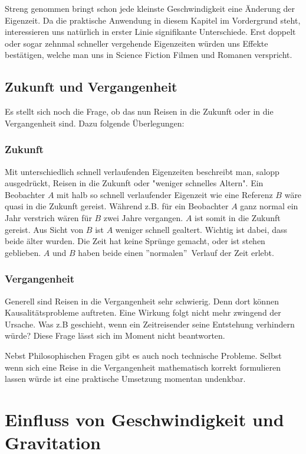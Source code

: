 \begin{refsection}
Streng genommen bringt schon jede kleinste Geschwindigkeit eine Änderung der Eigenzeit. Da die praktische Anwendung in diesem Kapitel im Vordergrund steht, interessieren uns natürlich in erster Linie signifikante Unterschiede. Erst doppelt oder sogar zehnmal schneller vergehende Eigenzeiten w\"urden uns Effekte best\"atigen, welche man uns in Science Fiction Filmen und Romanen verspricht.

\subsection{Zukunft und Vergangenheit}
Es stellt sich noch die Frage, ob das nun Reisen in die Zukunft oder in die Vergangenheit sind. Dazu folgende Überlegungen:

\subsubsection{Zukunft}
Mit unterschiedlich schnell verlaufenden Eigenzeiten beschreibt man, salopp ausgedrückt, Reisen in die Zukunft oder "weniger schnelles Altern". Ein Beobachter $A$ mit halb so schnell verlaufender Eigenzeit wie eine Referenz $B$ wäre quasi in die Zukunft gereist.
Während z.B. für ein Beobachter $A$ ganz normal ein Jahr verstrich wären für $B$ zwei Jahre vergangen. $A$ ist somit in die Zukunft gereist. Aus Sicht von $B$ ist $A$ weniger schnell gealtert. Wichtig ist dabei, dass beide älter wurden. Die Zeit hat keine Sprünge gemacht, oder ist stehen geblieben. $A$ und $B$ haben beide einen ''normalen''~Verlauf der Zeit erlebt.

\subsubsection{Vergangenheit}
Generell sind Reisen in die Vergangenheit sehr schwierig. Denn dort können Kausalitätsprobleme auftreten. Eine Wirkung folgt nicht mehr zwingend der Ursache. Was z.B geschieht, wenn ein Zeitreisender seine Entstehung verhindern würde? Diese Frage lässt sich im Moment nicht beantworten. 

Nebst Philosophischen Fragen gibt es auch noch technische Probleme. Selbst wenn sich eine Reise in die Vergangenheit mathematisch korrekt formulieren lassen würde ist eine praktische Umsetzung momentan undenkbar.

\section{Einfluss von Geschwindigkeit und Gravitation}


\end{refsection}
